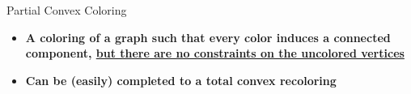 \begin{frame}{Partial Convex Coloring}

\begin{itemize}
\item \textbf<1>
{A coloring of a graph such that every color induces a connected component, 
\underline{but there are no constraints on the uncolored vertices}}

\item \textbf<2>
{Can be (easily) completed to a total convex recoloring}
   
\end{itemize}




\end{frame}
